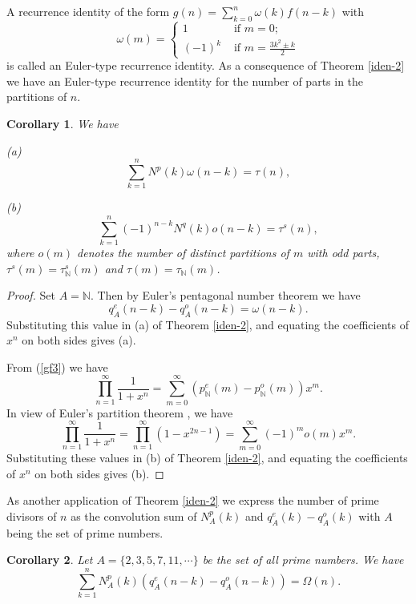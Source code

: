\documentclass[11pt]{article}
\newtheorem{corollary}{Corollary}
\begin{document}
A recurrence identity of the form $g(n)=\sum_{k=0}^{n}\omega(k)f(n-k)$ with 
\[\omega(m)=\begin{cases}1 &\text{ if }m=0;\\ 
(-1)^k &\text{ if }m=\frac{3k^2\pm k}{2}
\end{cases}
\]
is called an Euler-type recurrence identity. 
As a consequence of Theorem \ref{iden-2} we have an Euler-type recurrence identity for the number of parts in the partitions of $n$. 
\begin{corollary}
We have
\begin{description}
\item{(a)}
\begin{equation}\label{NOP}
\sum_{k=1}^{n}N^p(k)\omega(n-k)=\tau(n),
\end{equation}
\item{(b)}
\begin{equation}
\sum_{k=1}^{n}(-1)^{n-k}N^q(k)o(n-k)=\tau^s(n),
\end{equation}
where $o(m)$ denotes the number of distinct partitions of $m$ with odd parts, $\tau^s(m)=\tau_{\mathbb N}^s(m)$ and $\tau(m)=\tau_{\mathbb N}(m)$. 
\end{description}
\end{corollary}
\begin{proof}
Set $A=\mathbb N$. Then by Euler's pentagonal number theorem \cite{euler-pnt} we have \[
q_A^e(n-k)-q_A^o(n-k)=\omega(n-k).\] Substituting this value in (a) of Theorem \ref{iden-2}, and equating the coefficients of $x^n$ on both sides gives (a).

From (\ref{gf3}) we have
\[\prod_{n=1}^{\infty}\frac{1}{1+x^n}=\sum_{m=0}^{\infty}(p_{\mathbb N}^e(m)-p_{\mathbb N}^o(m))x^m.
\]
In view of Euler's partition theorem \cite{euler}, we have
\begin{equation}\label{ept}
\prod_{n=1}^{\infty}\frac{1}{1+x^n}=\prod_{n=1}^{\infty}(1-x^{2n-1})=\sum_{m=0}^{\infty}(-1)^mo(m)x^m.
\end{equation}
Substituting these values in (b) of Theorem \ref{iden-2}, and equating the coefficients of $x^n$ on both sides gives (b). 
\end{proof}
As another application of Theorem \ref{iden-2} we express the number of prime divisors of $n$ as the convolution sum of $N^p_A(k)$ and $q_A^e(k)-q_A^o(k)$ with $A$ being the set of prime numbers.
\begin{corollary}
Let $A=\{2,3,5,7,11,\cdots\}$ be the set of all prime numbers. We have
\begin{equation}
\sum_{k=1}^nN^p_A(k)(q_A^e(n-k)-q_A^o(n-k))=\Omega(n).
\end{equation}
\end{corollary}
\end{document}
